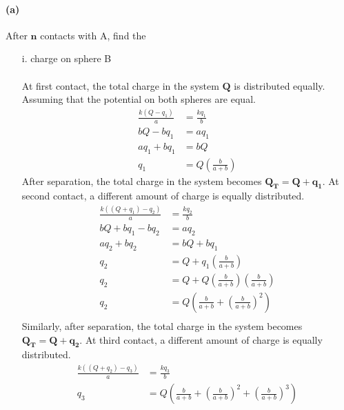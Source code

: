 \documentclass[]{article}
\begin{document}
{		\paragraph*{(a)} After $\bm{n}$ contacts with A, find the
			\begin{enumerate}[label=\roman*,topsep=0pt]
				\item[i.] charge on sphere B \\
				\\
					At first contact, the total charge in the system $\bm{Q}$ is distributed equally. Assuming that the potential on both spheres are equal.
						\begin{equation*}
							\begin{split}
								\frac{k(Q - q_1)}{a} &= \frac{kq_1}{b} \\
								bQ - bq_1 &= aq_1 \\
								aq_1 + bq_1 &= bQ \\
								q_1 &= Q \left( \frac{b}{a + b} \right)
							\end{split}
						\end{equation*}
					After separation, the total charge in the system becomes $\bm{Q_{T} = Q + q_1}$. At second contact, a different amount of charge is equally distributed.
						\begin{equation*}
							\begin{split}
								\frac{k( (Q + q_1) - q_2 )}{a} &= \frac{kq_2}{b} \\
								bQ + bq_1 - bq_2 &= aq_2 \\
								aq_2 + bq_2 &= bQ + bq_1 \\
								q_2 &= Q + q_1 \left( \frac{b}{a + b} \right) \\
								q_2 &= Q + Q \left( \frac{b}{a + b} \right) \left( \frac{b}{a + b} \right) \\
								q_2 &= Q \left( \frac{b}{a + b} + \left( \frac{b}{a + b} \right)^2 \right) \\
							\end{split}
						\end{equation*}
					Similarly, after separation, the total charge in the system becomes $\bm{Q_{T} = Q + q_2}$. At third contact, a different amount of charge is equally distributed.
						\begin{equation*}
							\begin{split}
								\frac{k( (Q + q_2) - q_3 )}{a} &= \frac{kq_3}{b} \\
								q_3 &= Q \left( \frac{b}{a + b} + \left( \frac{b}{a + b} \right)^2 + \left( \frac{b}{a + b} \right)^3 \right) \\

\end{split}
\end{equation*}
\end{enumerate}}
\end{document}
